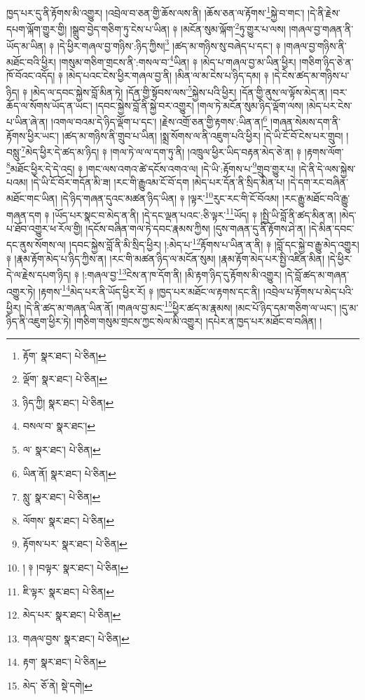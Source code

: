 ཁྱད་པར་དུ་ནི་རྟོགས་མི་འགྱུར། །འབྲེལ་བ་ཅན་གྱི་ཆོས་ལས་ནི། །ཆོས་ཅན་ལ་རྟོགས་\footnote{རྟོག་  སྣར་ཐང་།  པེ་ཅིན། }སྐྱེ་བ་གང་། །དེ་ནི་རྗེས་དཔག་ལྐོག་གྱུར་གྱི། །སྒྲུབ་བྱེད་གཅིག་ཏུ་ངེས་པ་ཡིན། ༈ །མངོན་སུམ་ལྐོག་\footnote{ལྡོག་  སྣར་ཐང་།  པེ་ཅིན། }ཏུ་གྱུར་པ་ལས། །གཞལ་བྱ་གཞན་ནི་ཡོད་མ་ཡིན། ༈ །དེ་ཕྱིར་གཞལ་བྱ་གཉིས་:ཉིད་ཀྱིས།\footnote{ཉིད་ཀྱི།  སྣར་ཐང་།  པེ་ཅིན། } །ཚད་མ་གཉིས་སུ་བཞེད་པ་དང་། ༈ །གཞལ་བྱ་གཉིས་ནི་མཐོང་བའི་ཕྱིར། །གསུམ་གཅིག་གྲངས་ནི་:གསལ་བ་\footnote{བསལ་བ་  སྣར་ཐང་། }ཡིན། ༈ །མེད་པ་གཞལ་བྱ་མ་ཡིན་ཕྱིར། །གཅིག་ཉིད་ཅེ་ན་ཁོ་བོའང་འདོད། ༈ །མེད་པའང་ངེས་ཕྱིར་གཞལ་བྱ་ནི། །མིན་ལ་མ་ངེས་པ་ཉིད་དམ། ༈ །དེ་ངེས་ཚད་མ་གཉིས་པ་ཉིད། ༈ །མེད་ལ་དབང་སྐྱེས་བློ་མིན་ཏེ། །དོན་གྱི་སྟོབས་ལས་\footnote{ལ་  སྣར་ཐང་།  པེ་ཅིན། }སྐྱེས་པའི་ཕྱིར། །དོན་གྱི་ནུས་ལ་ལྟོས་མེད་ན། །བར་ཆོད་ལ་སོགས་ཡོད་ན་ཡང་། །དབང་སྐྱེས་བློ་ནི་སྐྱེ་བར་འགྱུར། །གལ་ཏེ་མངོན་སུམ་ཉིད་ལྡོག་ལས། །མེད་པར་ངེས་པ་ཡིན་ཞེ་ན། །འགལ་བའམ་དེ་ཉིད་ལྡོག་པ་དང་། །རྗེས་འགྲོ་ཅན་གྱི་རྟགས་:ཡིན་ན།\footnote{ཡིན་ནོ།  སྣར་ཐང་།  པེ་ཅིན། } །གཞན་སེམས་དག་ནི་རྟོགས་ཕྱིར་ཡང་། །ཚད་མ་གཉིས་ནི་གྲུབ་པ་ཡིན། །སྨྲ་སོགས་ལ་ནི་འཇུག་པའི་ཕྱིར། །དེ་ཡི་ངོ་བོ་ངེས་པར་གྲུབ། །བསླུ་\footnote{སླུ་  སྣར་ཐང་།  པེ་ཅིན། }མེད་ཕྱིར་དེ་ཚད་མ་ཉིད། ༈ །གལ་ཏེ་ལ་ལ་དག་ཏུ་ནི། །འཁྲུལ་ཕྱིར་ཡིད་བརྟན་མེད་ཅེ་ན། ༈ །རྟགས་ལོག་\footnote{ལོགས་  སྣར་ཐང་།  པེ་ཅིན། }མཐོང་ཕྱིར་དེ་དེ་འདྲ། ༈ །གང་ལས་འགའ་ཚེ་དངོས་འགའ་ལ། །དེ་ཡི་:རྟོགས་པ་\footnote{རྟོགས་པར་  སྣར་ཐང་།  པེ་ཅིན། }གྲུབ་གྱུར་པ། །དེ་ནི་དེ་ལས་སྐྱེས་པའམ། །དེ་ཡི་ངོ་བོར་གདོན་མི་ཟ། །རང་གི་རྒྱུའམ་ངོ་བོ་དག །མེད་པར་དོན་ནི་སྲིད་མིན་པ། །དེ་དག་རང་བཞིན་མཐོང་གང་ཡིན། །དེ་ཉིད་གཞན་དུའང་མཚན་ཉིད་ཡིན། ༈ །ལྟར་\footnote{། ༈ །བལྟར་  སྣར་ཐང་།  པེ་ཅིན། }རུང་རང་གི་ངོ་བོའམ། །རང་རྒྱུ་མཐོང་བའི་རྒྱུ་གཞན་དག ༈ །ཡོད་པར་སྣང་བ་མེད་ན་ནི། །དེ་དང་ལྡན་པའང་:ཅི་ལྟར་\footnote{ཇི་ལྟར་  སྣར་ཐང་།  པེ་ཅིན། }ཡོད། ༈ །སྤྱི་ཡི་བློ་ནི་ཚད་མིན་ན། །མེད་པ་ཐོབ་འགྱུར་ཕ་རོལ་གྱི། །དངོས་བཞིན་གལ་ཏེ་དབང་རྣམས་ཀྱིས། །དུས་གཞན་དུ་ནི་རྟོགས་ཤེ་ན། །དེ་མིན་དབང་དང་ནུས་སོགས་ལ། །དབང་སྐྱེས་བློ་ནི་མི་སྲིད་ཕྱིར། །:མེད་པ་\footnote{མེད་པར་  སྣར་ཐང་།  པེ་ཅིན། }རྟོགས་པ་ཡིན་ན་ནི། ༈ །བློ་དང་སྐྱེ་བ་རྒྱུ་མེད་འགྱུར། ༈ །རྣམ་རྟོག་མེད་པ་ཉིད་ཀྱིས་ན། །རང་གི་མཚན་ཉིད་ལ་མངོན་སུམ། །རྣམ་རྟོག་མེད་པར་སྤྱི་འཛིན་མིན། །དེ་ཕྱིར་དེ་ལ་རྗེས་དཔག་ཉིད། ༈ །:གཞལ་བྱ་\footnote{གཞལ་བྱས་  སྣར་ཐང་།  པེ་ཅིན། }ངེས་ན་ཁ་དོག་ནི། །མི་རྟག་ཉིད་དུ་རྟོགས་མི་འགྱུར། །དེ་བློ་ཚད་མ་གཞན་འགྱུར་ཏེ། །རྟགས་\footnote{རྟག་  སྣར་ཐང་།  པེ་ཅིན། }མེད་པར་ནི་ཡོད་ཕྱིར་རོ། ༈ །ཁྱད་པར་མཐོང་ལ་རྟགས་དང་ནི། །འབྲེལ་པ་རྟོགས་པ་མེད་པའི་ཕྱིར། །དེ་ནི་ཚད་མ་གཞན་ཡིན་ནོ། །གཞལ་བྱ་མང་\footnote{མེད་  ཅོ་ནེ།  སྡེ་དགེ། }ཕྱིར་ཚད་མ་རྣམས། །མང་པོ་ཉིད་དམ་གཅིག་ལ་ཡང་། །དུ་མ་ཉིད་ནི་འཇུག་ཕྱིར་ཏེ། །གཅིག་གསུམ་གྲངས་ཀྱང་སེལ་མི་འགྱུར། །དཔེར་ན་ཁྱད་པར་མཐོང་བ་བཞིན། །
